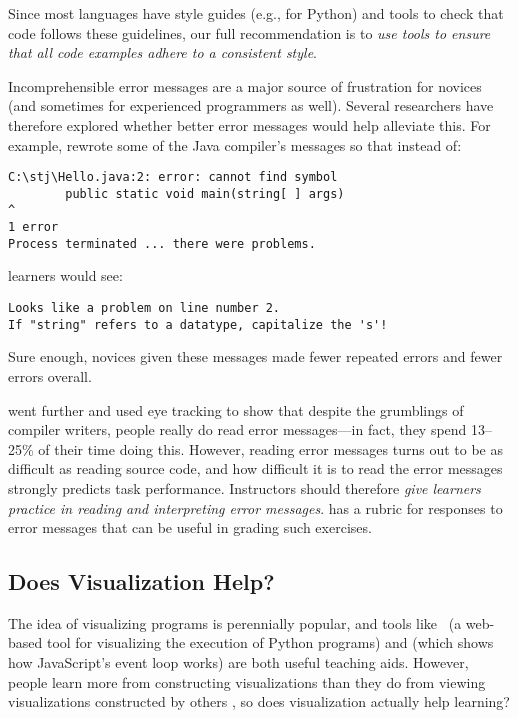 Since most languages have style guides (e.g.,  for Python) and tools to check that code follows these guidelines, our full recommendation is to \emph{use tools to ensure that all code examples adhere to a consistent style}.


Incomprehensible error messages are a major source of frustration for novices (and sometimes for experienced programmers as well). Several researchers have therefore explored whether better error messages would help alleviate this. For example, \cite{Beck2016} rewrote some of the Java compiler's messages so that instead of:

\begin{verbatim}
C:\stj\Hello.java:2: error: cannot find symbol
        public static void main(string[ ] args)
^
1 error
Process terminated ... there were problems.
\end{verbatim}

\noindent
learners would see:

\begin{verbatim}
Looks like a problem on line number 2.
If "string" refers to a datatype, capitalize the 's'!
\end{verbatim}

Sure enough, novices given these messages made fewer repeated errors and fewer errors overall.

\cite{Bari2017} went further and used eye tracking to show that despite the grumblings of compiler writers, people really do read error messages---in fact, they spend 13--25\% of their time doing this. However, reading error messages turns out to be as difficult as reading source code, and how difficult it is to read the error messages strongly predicts task performance. Instructors should therefore \emph{give learners practice in reading and interpreting error messages}. \cite{Marc2011} has a rubric for responses to error messages that can be useful in grading such exercises.

\subsection*{Does Visualization Help?}

The idea of visualizing programs is perennially popular, and tools like~\cite{Guo2013} (a web-based tool for visualizing the execution of Python programs) and  (which shows how JavaScript's event loop works) are both useful teaching aids. However, people learn more from constructing visualizations than they do from viewing visualizations constructed by others \cite{Stas1998,Ceti2016}, so does visualization actually help learning?

